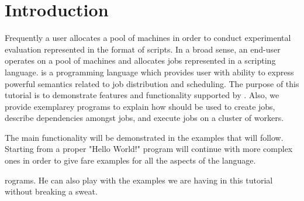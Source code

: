 \section{Introduction}
\label{sect:intro}

%
%
Frequently a user allocates a pool of machines in order to conduct experimental
evaluation represented in the format of scripts. In a broad sense, an end-user
operates on a pool of machines and allocates jobs represented in a scripting
language. \lang{} is a programming language which provides user with ability
to express powerful semantics related to job distribution and scheduling.
The purpose of this tutorial is to demonstrate features and functionality 
supported by  \lang{}. Also, we provide exemplarey programs  to
explain how \lang{}  should be used to create jobs, describe dependencies amongst jobs,
and execute jobs on a cluster of workers. 



The main functionality will be demonstrated in the examples that will follow. Starting from a 
proper "Hello World!" program will continue with more complex ones in order to give fare examples
for all the aspects of the language.


rograms. He can also play with the examples we are having in this tutorial without breaking a sweat.
